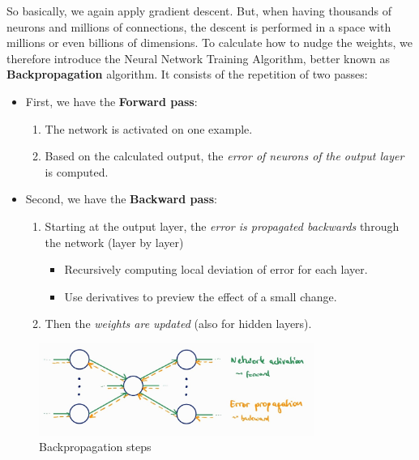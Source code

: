 So basically, we again apply gradient descent. But, when having thousands of neurons and millions of connections, the descent is performed in a space with millions or even billions of dimensions. To calculate how to nudge the weights, we therefore introduce the Neural Network Training Algorithm, better known as \textbf{Backpropagation} algorithm. It consists of the repetition of two passes:
\begin{itemize}
  \item First, we have the \textbf{Forward pass}:
  \begin{enumerate}
    \item The network is activated on one example.
    \item Based on the calculated output, the \textit{error of neurons of the output layer} is computed.
  \end{enumerate}
  \item Second, we have the \textbf{Backward pass}:
  \begin{enumerate}
    \item Starting at the output layer, the \textit{error is propagated backwards} through the network (layer by layer)
    \begin{note}\begin{itemize}
      \item Recursively computing local deviation of error for each layer.
      \item Use derivatives to preview the effect of a small change.
    \end{itemize}\end{note}
    \item Then the \textit{weights are updated} (also for hidden layers).
  \end{enumerate}
\end{itemize}

\begin{figure}[H]
  \centering
  \includegraphics[width=0.8\textwidth]{assets/nn/bp__principle_steps.jpg}

  \caption{Backpropagation steps}
  \label{fig:6_bp_steps}
\end{figure}

